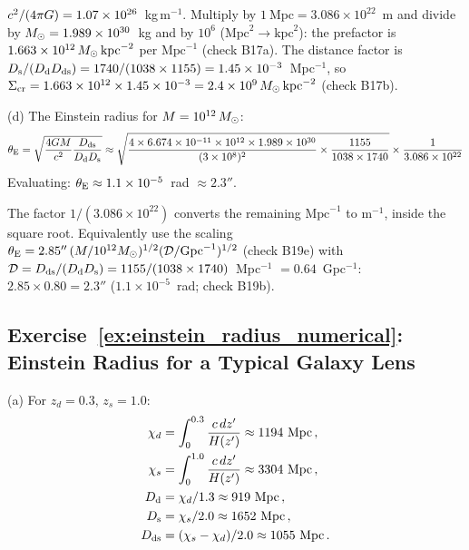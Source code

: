 \begin{derivation}
$c^2/(4\pi G) = 1.07\times10^{26}$~kg\,m$^{-1}$.  Multiply by
$1~\text{Mpc} = 3.086\times10^{22}$~m and divide by $M_{\odot} = 1.989\times10^{30}$~kg
and by $10^6$ ($\text{Mpc}^2 \to \text{kpc}^2$): the prefactor is
$1.663\times10^{12}\,M_{\odot}\,\text{kpc}^{-2}$ per $\text{Mpc}^{-1}$ (check B17a).
The distance factor is $D_{\mathrm{s}}/(D_{\mathrm{d}}D_{\mathrm{ds}}) = 1740/(1038\times1155)
= 1.45\times10^{-3}$~Mpc$^{-1}$, so
$\Sigma_{\mathrm{cr}} = 1.663\times10^{12}\times1.45\times10^{-3} = 2.4\times10^9\,M_{\odot}\,\text{kpc}^{-2}$
(check B17b).
\end{derivation}
(d) The Einstein radius for $M = 10^{12}\,M_{\odot}$:
\[
    \theta_{\mathrm{E}} = \sqrt{\frac{4G M}{c^2}
    \frac{D_{\mathrm{ds}}}{D_{\mathrm{d}}D_{\mathrm{s}}}}
    \approx \sqrt{\frac{4 \times 6.674 \times 10^{-11}
    \times 10^{12} \times 1.989 \times 10^{30}}
    {(3 \times 10^8)^2}
    \times \frac{1155}{1038 \times 1740}} \times \frac{1}{3.086 \times 10^{22}}
\]
Evaluating: $\theta_{\mathrm{E}} \approx 1.1 \times 10^{-5}$~rad $\approx \boxed{2.3''}$.


\begin{derivation}
The factor $1/(3.086\times10^{22})$ converts the remaining $\text{Mpc}^{-1}$ to
$\text{m}^{-1}$, inside the square root.  Equivalently use the scaling
$\theta_{\mathrm{E}} = 2.85''\,(M/10^{12}M_{\odot})^{1/2}(\mathcal D/\text{Gpc}^{-1})^{1/2}$
(check B19e) with $\mathcal D = D_{\mathrm{ds}}/(D_{\mathrm{d}}D_{\mathrm{s}}) = 1155/(1038\times1740)$~Mpc$^{-1}$
$= 0.64$~Gpc$^{-1}$: $2.85\times0.80 = 2.3''$ ($1.1\times10^{-5}$~rad;
check B19b).
\end{derivation}
\subsection*{Exercise~\ref{ex:einstein_radius_numerical}: Einstein Radius for a Typical Galaxy Lens}

(a) For $z_d = 0.3$, $z_s = 1.0$:
\begin{align*}
    \chi_d &= \int_0^{0.3} \frac{c\, dz'}{H(z')}
    \approx 1194~\text{Mpc} \,, \\
    \chi_s &= \int_0^{1.0} \frac{c\, dz'}{H(z')}
    \approx 3304~\text{Mpc} \,, \\
    D_{\mathrm{d}} &= \chi_d / 1.3 \approx 919~\text{Mpc} \,, \\
    D_{\mathrm{s}} &= \chi_s / 2.0 \approx 1652~\text{Mpc} \,, \\
    D_{\mathrm{ds}} &= (\chi_s - \chi_d) / 2.0 \approx 1055~\text{Mpc} \,.
\end{align*}

